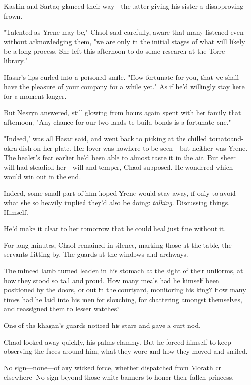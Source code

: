 Kashin and Sartaq glanced their way---the latter giving his sister a disapproving frown.

"Talented as Yrene may be," Chaol said carefully, aware that many listened even without acknowledging them, "we are only in the initial stages of what will likely be a long process. She left this afternoon to do some research at the Torre library."

Hasar's lips curled into a poisoned smile. "How fortunate for you, that we shall have the pleasure of your company for a while yet." As if he'd willingly stay here for a moment longer.

But Nesryn answered, still glowing from hours again spent with her family that afternoon, "Any chance for our two lands to build bonds is a fortunate one."

"Indeed," was all Hasar said, and went back to picking at the chilled tomatoand-okra dish on her plate. Her lover was nowhere to be seen---but neither was Yrene. The healer's fear earlier  he'd been able to almost taste it in the air. But sheer will had steadied her---will and temper, Chaol supposed. He wondered which would win out in the end.

Indeed, some small part of him hoped Yrene would stay away, if only to avoid what she so heavily implied they'd also be doing: \emph{talking}. Discussing things. Himself.

He'd make it clear to her tomorrow that he could heal just fine without it.

For long minutes, Chaol remained in silence, marking those at the table, the servants flitting by. The guards at the windows and archways.

The minced lamb turned leaden in his stomach at the sight of their uniforms, at how they stood so tall and proud. How many meals had he himself been positioned by the doors, or out in the courtyard, monitoring his king? How many times had he laid into his men for slouching, for chattering amongst themselves, and reassigned them to lesser watches?

One of the khagan's guards noticed his stare and gave a curt nod.

Chaol looked away quickly, his palms clammy. But he forced himself to keep observing the faces around him, what they wore and how they moved and smiled.

No sign---none---of any wicked force, whether dispatched from Morath or elsewhere. No sign beyond those white banners to honor their fallen princess.


